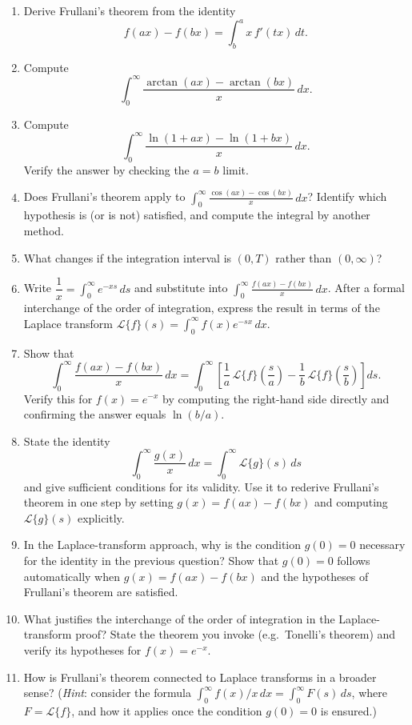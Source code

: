 \begin{enumerate}

  \item Derive Frullani's theorem from the identity
    \[ f(ax) - f(bx) = \int_{b}^{a} x\,f'(tx)\,dt. \]
  \item Compute
    \[ \int_{0}^{\infty} \frac{\arctan(ax) - \arctan(bx)}{x}\,dx. \]
  \item Compute
    \[ \int_{0}^{\infty} \frac{\ln(1+ax) - \ln(1+bx)}{x}\,dx. \]
    Verify the answer by checking the \(a = b\) limit.
  \item Does Frullani's theorem apply to \(\displaystyle\int_{0}^{\infty} \frac{\cos(ax) - \cos(bx)}{x}\,dx\)? Identify which hypothesis is (or is not) satisfied, and compute the integral by another method.
  \item What changes if the integration interval is \((0,T)\) rather than \((0,\infty)\)?


  \item Write \(\dfrac{1}{x}= \int_{0}^{\infty} e^{-xs}\,ds\) and substitute into \(\displaystyle\int_{0}^{\infty} \frac{f(ax)-f(bx)}{x}\,dx\). After a formal interchange of the order of integration, express the result in terms of the Laplace transform \(\mathcal{L}\{f\}(s) = \int_{0}^{\infty} f(x)e^{-sx}\,dx\).
  \item Show that
    \[ \int_{0}^{\infty} \frac{f(ax)-f(bx)}{x}\,dx = \int_{0}^{\infty} \left[ \frac{1}{a}\,\mathcal{L}\{f\}\!\left(\frac{s}{a}\right) - \frac{1}{b}\,\mathcal{L}\{f\}\!\left(\frac{s}{b}\right) \right]ds. \]
    Verify this for \(f(x) = e^{-x}\) by computing the right-hand side directly and confirming the answer equals \(\ln(b/a)\).
  \item State the identity
    \[ \int_{0}^{\infty} \frac{g(x)}{x}\,dx = \int_{0}^{\infty} \mathcal{L}\{g\}(s)\,ds \]
    and give sufficient conditions for its validity. Use it to rederive Frullani's theorem in one step by setting \(g(x) = f(ax) - f(bx)\) and computing \(\mathcal{L}\{g\}(s)\) explicitly.
  \item In the Laplace-transform approach, why is the condition \(g(0) = 0\) necessary for the identity in the previous question? Show that \(g(0) = 0\) follows automatically when \(g(x) = f(ax) - f(bx)\) and the hypotheses of Frullani's theorem are satisfied.
  \item What justifies the interchange of the order of integration in the Laplace-transform proof? State the theorem you invoke (e.g.\ Tonelli's theorem) and verify its hypotheses for \(f(x) = e^{-x}\).
  \item How is Frullani's theorem connected to Laplace transforms in a broader sense? (\textit{Hint}: consider the formula \(\int_{0}^{\infty} f(x)/x\,dx = \int_{0}^{\infty} F(s)\,ds\), where \(F = \mathcal{L}\{f\}\), and how it applies once the condition \(g(0) = 0\) is ensured.)


\end{enumerate}
